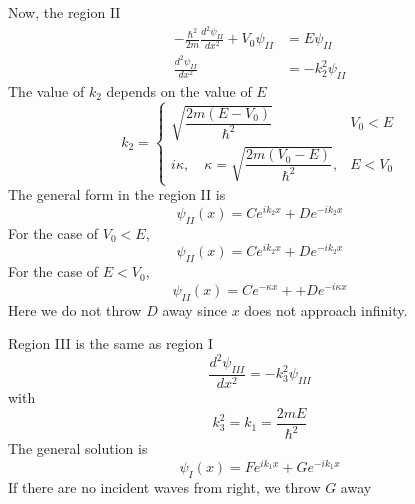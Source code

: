 \documentclass[../../../main.tex]{subfiles}
\begin{document}
Now, the region II
\begin{align*}
    -\frac{\hbar^2}{2m} \frac{d^2 \psi_{II}}{dx^2} + V_0 \psi_{II} & =  E \psi_{II}      \\
    \frac{d^2 \psi_{II}}{dx^2}                                     & = - k_2^2 \psi_{II}
\end{align*}
The value  of $k_2$ depends on the value of $E$
\begin{equation*}
    k_2 =
    \begin{cases}
        \sqrt{\dfrac{2 m (E - V_0)}{\hbar^2}}                           & V_0<E   \\
        i \kappa, \quad \kappa = \sqrt{\dfrac{2 m (V_0 - E)}{\hbar^2}}, & E < V_0
    \end{cases}
\end{equation*}
The general form in the region II is
\begin{equation*}
    \psi_{II}(x)=C e^{i k_2 x} + D e^{-i k_2 x}
\end{equation*}
For the case of $V_0<E$,
\begin{equation*}
    \psi_{II}(x) = C e^{i k_2 x} + D e^{-i k_2 x}
\end{equation*}
For the case of $E<V_0$,
\begin{equation*}
    \psi_{II}(x) =C e^{-\kappa x}+ + D e^{-i\kappa x}
\end{equation*}
Here we do not throw $D$ away since $x$ does not approach infinity.

Region III is the same as region I
\begin{equation*}
    \frac{d^2 \psi_{III}}{dx^2} = - k_3^2 \psi_{III}
\end{equation*}
with
\begin{equation*}
    k_3^2 =k_1=\frac{2 m E}{\hbar^2}
\end{equation*}
The general solution is
\begin{equation*}
    \psi_I(x) = F e^{i k_1 x} + G e^{-i k_1 x}
\end{equation*}
If there are no incident waves from right, we throw $G$ away
\end{document}
